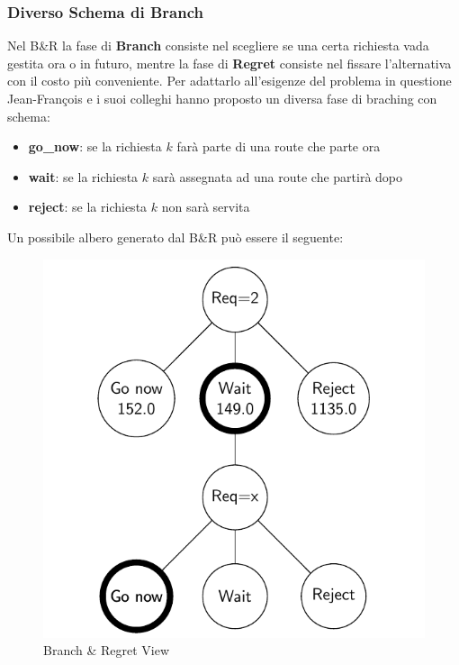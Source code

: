\documentclass[
    article,            %
    12pt,                %
    oneside,            %
    a4paper,            %
    english,            %
    italian,                %
    sumario=tradicional,
]{abntex2}
\begin{document}
\hypertarget{diverso-schema-di-branch}{%
\subsubsection{Diverso Schema di Branch}\label{diverso-schema-di-branch}}
Nel B\&R la fase di \textbf{Branch} consiste nel scegliere se una certa richiesta vada gestita ora o in futuro, mentre la fase di \textbf{Regret} consiste nel fissare l'alternativa con il costo più conveniente. 
Per adattarlo all'esigenze del problema in questione Jean-François e i suoi colleghi hanno proposto un diversa fase di braching con schema:

\begin{itemize}
    \item \textbf{go\_now}: se la richiesta {\(k\)} farà parte di una route che parte ora
    \item \textbf{wait}: se la richiesta {\(k\)} sarà assegnata ad una route che partirà dopo
    \item \textbf{reject}: se la richiesta {\(k\)} non sarà servita
\end{itemize}

Un possibile albero generato dal B\&R può essere il seguente:

\begin{figure}[h!]
    \centering
    \includegraphics[scale=0.32]{Images/Branch-And-Regret-View.png}
    \caption{Branch \& Regret View}
    \label{fig:Branch-and-RegretView}
\end{figure}
\end{document}

